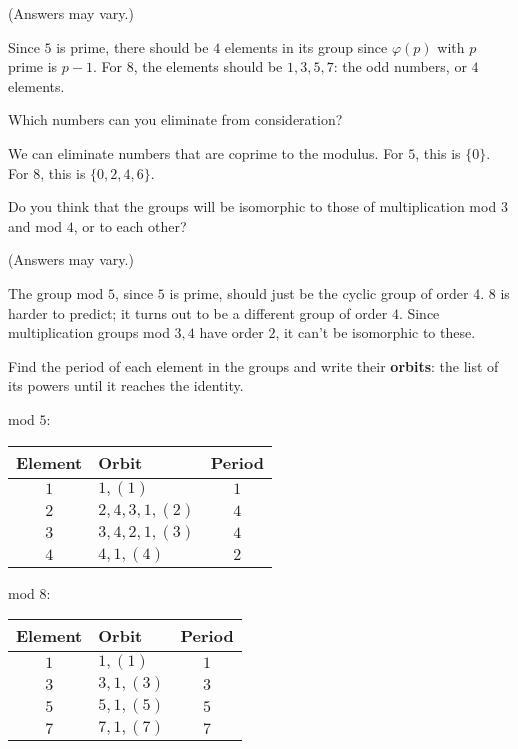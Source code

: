 \documentclass[../gatm_answers.tex]{subfiles}
\begin{document}
(Answers may vary.)

Since $5$ is prime, there should be $4$ elements in its group since $\varphi(p)$ with $p$ prime is $p-1$. For $8$, the elements should be $1,3,5,7$: the odd numbers, or $4$ elements.

\begin{inner_problem}
\item Which numbers can you eliminate from consideration?
\end{inner_problem}

We can eliminate numbers that are coprime to the modulus. For $5$, this is $\{0\}$. For $8$, this is $\{0,2,4,6\}$.

\begin{inner_problem}
\item Do you think that the groups will be isomorphic to those of multiplication mod $3$ and mod $4$, or to each other?
\end{inner_problem}

(Answers may vary.)

The group mod $5$, since $5$ is prime, should just be the cyclic group of order $4$. $8$ is harder to predict; it turns out to be a different group of order $4$. Since multiplication groups mod $3,4$ have order $2$, it can't be isomorphic to these.

\begin{inner_problem}
\item Find the period of each element in the groups and write their \textbf{orbits}: the list of its powers until it reaches the identity.
\end{inner_problem}

\begin{minipage}{0.45\textwidth}
  mod $5$:

\begin{tabular}{c|l|c}
  Element & Orbit & Period \\ \hline
  $1$ & $1, (1)$ & $1$ \\
  $2$ & $2, 4, 3, 1, (2)$ & $4$ \\
  $3$ & $3, 4, 2, 1, (3)$ & $4$ \\
  $4$ & $4, 1, (4)$ & $2$ \\
\end{tabular}
\end{minipage}\hfill
\begin{minipage}{0.45\textwidth}
mod $8$:
\begin{tabular}{c|l|c}
  Element & Orbit & Period \\ \hline
  $1$ & $1, (1)$ & $1$ \\
  $3$ & $3, 1, (3)$ & $3$ \\
  $5$ & $5, 1, (5)$ & $5$ \\
  $7$ & $7, 1, (7)$ & $7$ \\
\end{tabular}
\end{minipage}
\end{document}
